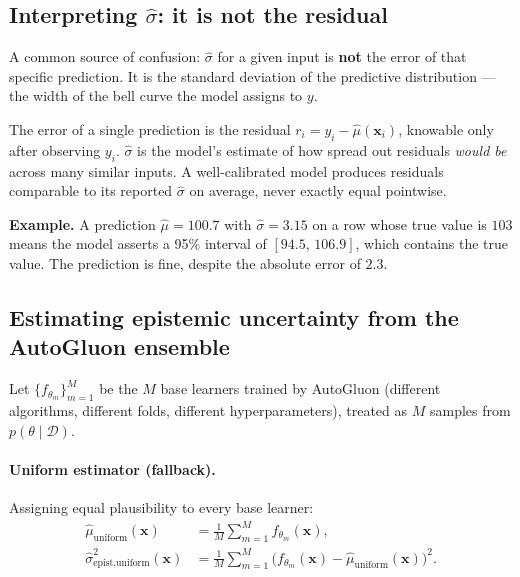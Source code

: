 \documentclass[11pt,a4paper]{article}
\begin{document}
\subsection{Interpreting \texorpdfstring{$\hat\sigma$}{sigma-hat}: it is not the residual}

\begin{recapbox}
A common source of confusion: $\hat\sigma$ for a given input is \textbf{not} the error of that specific prediction. It is the standard deviation of the predictive distribution --- the width of the bell curve the model assigns to $y$.

The error of a single prediction is the residual $r_i = y_i - \hat\mu(\bm x_i)$, knowable only after observing $y_i$. $\hat\sigma$ is the model's estimate of how spread out residuals \emph{would be} across many similar inputs. A well-calibrated model produces residuals comparable to its reported $\hat\sigma$ on average, never exactly equal pointwise.

\textbf{Example.} A prediction $\hat\mu = 100.7$ with $\hat\sigma = 3.15$ on a row whose true value is $103$ means the model asserts a 95\% interval of $[94.5,\, 106.9]$, which contains the true value. The prediction is fine, despite the absolute error of $2.3$.
\end{recapbox}

\subsection{Estimating epistemic uncertainty from the AutoGluon ensemble}
\label{sec:weight-recovery}

Let $\{f_{\theta_m}\}_{m=1}^M$ be the $M$ base learners trained by AutoGluon (different algorithms, different folds, different hyperparameters), treated as $M$ samples from $p(\theta \mid \mathcal{D})$.

\paragraph{Uniform estimator (fallback).} Assigning equal plausibility to every base learner:
\begin{align}
\hat\mu_{\text{uniform}}(\bm x) &= \frac{1}{M} \sum_{m=1}^M f_{\theta_m}(\bm x),
\label{eq:mu-hat}\\
\hat\sigma^2_{\text{epist},\text{uniform}}(\bm x) &= \frac{1}{M} \sum_{m=1}^M \big(f_{\theta_m}(\bm x) - \hat\mu_{\text{uniform}}(\bm x)\big)^2.
\label{eq:sigma-epist}
\end{align}
\end{document}
